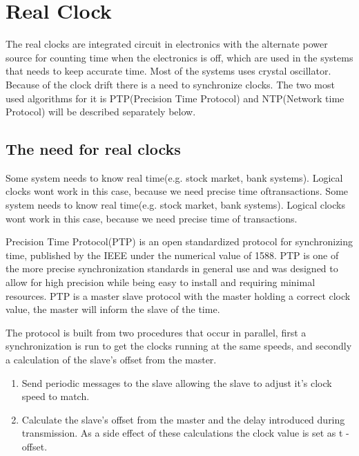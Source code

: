 \section{Real Clock}\label{sc:realClock}

The real clocks are integrated circuit in electronics with the alternate power source for counting time when the electronics is off, which are used in the systems that needs to keep accurate time. Most of the systems uses crystal oscillator. Because of the clock drift there is a need to synchronize clocks. The two most used algorithms for it is PTP(Precision Time Protocol) and NTP(Network time Protocol) will be described separately below.

\subsection{The need for real clocks}
Some system needs to know real time(e.g. stock market, bank systems). Logical clocks wont work in this case, because we need precise time oftransactions.
Some system needs to know real time(e.g. stock market, bank systems). Logical clocks wont work in this
case, because we need precise time of transactions.



Precision Time Protocol(PTP) is an open standardized protocol for synchronizing time, published by the IEEE under the numerical value of 1588. PTP is one of the more precise synchronization standards in general use and was designed to allow for high precision while being easy to install and requiring minimal resources. PTP is a master slave protocol with the master holding a correct clock value, the master will inform the slave of the time.

\noindent The protocol is built from two procedures that occur in parallel, first a synchronization is run to get the clocks running at the same speeds, and secondly a calculation of the slave's offset from the master. 
\begin{enumerate}
\item Send periodic messages to the slave allowing the slave to adjust it's clock speed to match.
\item Calculate the slave's offset from the master and the delay introduced during transmission. As a side effect of these calculations the clock value is set as t - offset.
\end{enumerate}

